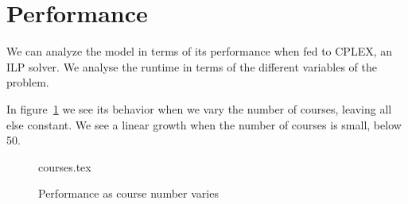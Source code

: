\newpage
\section{Performance}

We can analyze the model in terms of its performance when fed to CPLEX, an ILP solver. We analyse the runtime in terms of the different variables of the problem.

In figure~\ref{bench:courses} we see its behavior when we vary the number of courses, leaving all else constant. We see a linear growth when the number of courses is small, below 50.

\begin{figure}
\begin{center}
{courses.tex}
\caption{Performance as course number varies}
\label{bench:courses}
\end{center}
\end{figure}
